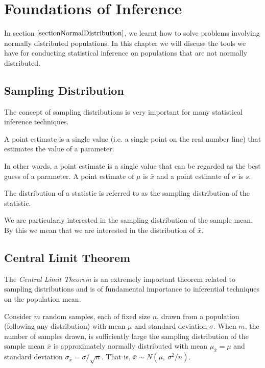 \chapter{Foundations of Inference}
\label{SectionFoundationsOfInference}

In section $\ref{sectionNormalDistribution}$, we learnt how to solve problems involving normally distributed populations. In this chapter we will discuss the tools we have for conducting statistical inference on populations that are not normally distributed.

\section{Sampling Distribution}
\label{sectionSamplingDistrib}

The concept of sampling distributions is very important for many statistical inference techniques.

\begin{definition}
A point estimate is a single value (i.e. a single point on the real number line) that estimates the value of a parameter.
\end{definition}

In other words, a point estimate is a single value that can be regarded as the best guess of a parameter. A point estimate of $\mu$ is $\bar{x}$ and a point estimate of $\sigma$ is $s$.

\begin{definition}
The distribution of a statistic is referred to as the sampling distribution of the statistic.
\end{definition}

We are particularly interested in the sampling distribution of the sample mean. By this we mean that we are interested in the distribution of $\bar{x}$.


\section{Central Limit Theorem}
\label{sectionCLT}

The \textit{Central Limit Theorem} is an extremely important theorem related to sampling distributions and is of fundamental importance to inferential techniques on the population mean.

\begin{thm} \label{theoremCLT}
Consider $m$ random samples, each of fixed size $n$, drawn from a population (following any distribution) with mean $\mu$ and standard deviation $\sigma$. When $m$, the number of samples drawn, is sufficiently large the sampling distribution of the sample mean $\bar{x}$ is approximately normally distributed with mean $\mu_{\bar{x}} = \mu$ and standard deviation $\sigma_{\bar{x}} = \sigma / \sqrt{n}$. That is, $\bar{x} \sim N(\mu,~ \sigma^{2}/n)$.
\end{thm}

